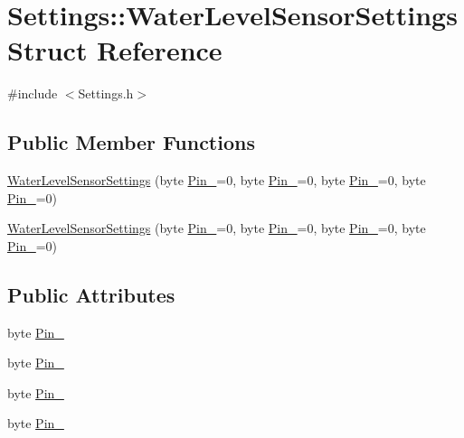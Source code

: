 \hypertarget{struct_settings_1_1_water_level_sensor_settings}{}\section{Settings\+:\+:Water\+Level\+Sensor\+Settings Struct Reference}
\label{struct_settings_1_1_water_level_sensor_settings}


{\ttfamily \#include $<$Settings.\+h$>$}

\subsection*{Public Member Functions}
\begin{DoxyCompactItemize}
\item 
\hyperlink{struct_settings_1_1_water_level_sensor_settings_abae12e211e09974d92a124bbb191240b}{Water\+Level\+Sensor\+Settings} (byte \hyperlink{struct_settings_1_1_water_level_sensor_settings_a6043f3fd71808fc89192aa4ecc139701}{Pin\+\_}=0, byte \hyperlink{struct_settings_1_1_water_level_sensor_settings_a2ba425a635a5161feaee8ec460c71961}{Pin\+\_}=0, byte \hyperlink{struct_settings_1_1_water_level_sensor_settings_a8db93bf79e5d157ac49a20305b6e5d1b}{Pin\+\_}=0, byte \hyperlink{struct_settings_1_1_water_level_sensor_settings_a13f621821f6b2dedff7ec59cc7efddfe}{Pin\+\_}=0)
\item 
\hyperlink{struct_settings_1_1_water_level_sensor_settings_abae12e211e09974d92a124bbb191240b}{Water\+Level\+Sensor\+Settings} (byte \hyperlink{struct_settings_1_1_water_level_sensor_settings_a6043f3fd71808fc89192aa4ecc139701}{Pin\+\_}=0, byte \hyperlink{struct_settings_1_1_water_level_sensor_settings_a2ba425a635a5161feaee8ec460c71961}{Pin\+\_}=0, byte \hyperlink{struct_settings_1_1_water_level_sensor_settings_a8db93bf79e5d157ac49a20305b6e5d1b}{Pin\+\_}=0, byte \hyperlink{struct_settings_1_1_water_level_sensor_settings_a13f621821f6b2dedff7ec59cc7efddfe}{Pin\+\_}=0)
\end{DoxyCompactItemize}
\subsection*{Public Attributes}
\begin{DoxyCompactItemize}
\item 
byte \hyperlink{struct_settings_1_1_water_level_sensor_settings_a6043f3fd71808fc89192aa4ecc139701}{Pin\+\_}
\item 
byte \hyperlink{struct_settings_1_1_water_level_sensor_settings_a2ba425a635a5161feaee8ec460c71961}{Pin\+\_}
\item 
byte \hyperlink{struct_settings_1_1_water_level_sensor_settings_a8db93bf79e5d157ac49a20305b6e5d1b}{Pin\+\_}
\item 
byte \hyperlink{struct_settings_1_1_water_level_sensor_settings_a13f621821f6b2dedff7ec59cc7efddfe}{Pin\+\_}
\end{DoxyCompactItemize}


